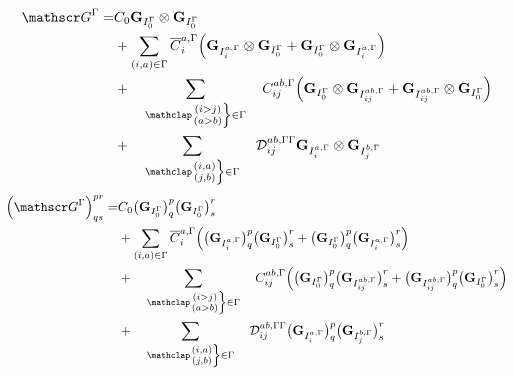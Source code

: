 \documentclass[a4paper,11pt]{article}
\begin{document}
\begin{equation}
  \begin{split}
    \bigG^\irp = &
    C_0 \matG_{I_0^\irp} \otimes \matG_{I_0^\irp}\\
    & + \sum_{(i,a) \in \irp} \overline{C}_i^{a,\irp}
    \Big(
        \matG_{I_i^{a,\irp}} \otimes \matG_{I_0^\irp}
        + \matG_{I_0^\irp} \otimes \matG_{I_i^{a,\irp}}
    \Big)\\
    & + \sumijabrestr C_{ij}^{ab, \irp}
    \Big(
        \matG_{I_0^\irp} \otimes \matG_{I_{ij}^{ab,\irp}}
        + \matG_{I_{ij}^{ab,\irp}} \otimes \matG_{I_0^\irp}
    \Big)\\
    & + \sumijabfull \Dmix_{ij}^{ab, \irp\irp}
    \matG_{I_i^{a,\irp}} \otimes \matG_{I_j^{b,\irp}}\\
  \end{split}
\end{equation}
\begin{equation}
  \begin{split}
    \Big(\bigG^\irp\Big)^{pr}_{qs} = &
    C_0 \big( \matG_{I_0^\irp} \big)^p_q \big( \matG_{I_0^\irp} \big)^r_s\\
    & + \sum_{(i,a) \in \irp} \overline{C}_i^{a,\irp}
    \Big(
        \big( \matG_{I_i^{a,\irp}} \big)^p_q \big( \matG_{I_0^\irp} \big)^r_s
        + \big( \matG_{I_0^\irp} \big)^p_q \big( \matG_{I_i^{a,\irp}} \big)^r_s
    \Big)\\
    & + \sumijabrestr C_{ij}^{ab, \irp}
    \Big(
        \big( \matG_{I_0^\irp} \big)^p_q \big( \matG_{I_{ij}^{ab,\irp}} \big)^r_s
        + \big( \matG_{I_{ij}^{ab,\irp}} \big)^p_q \big( \matG_{I_0^\irp} \big)^r_s
    \Big)\\
    & + \sumijabfull \Dmix_{ij}^{ab, \irp\irp}
    \big( \matG_{I_i^{a,\irp}} \big)^p_q \big( \matG_{I_j^{b,\irp}} \big)^r_s
  \end{split}
\end{equation}
\end{document}

